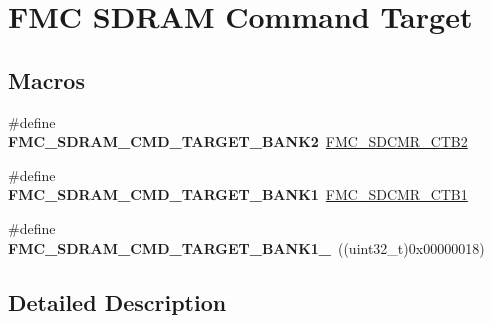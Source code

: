 \hypertarget{group___f_m_c___s_d_r_a_m___command___target}{}\section{F\+MC S\+D\+R\+AM Command Target}
\label{group___f_m_c___s_d_r_a_m___command___target}
\subsection*{Macros}
\begin{DoxyCompactItemize}
\item 
\#define {\bfseries F\+M\+C\+\_\+\+S\+D\+R\+A\+M\+\_\+\+C\+M\+D\+\_\+\+T\+A\+R\+G\+E\+T\+\_\+\+B\+A\+N\+K2}~\hyperlink{group___peripheral___registers___bits___definition_ga87be0a3520cec2885d2fc16589b97ba0}{F\+M\+C\+\_\+\+S\+D\+C\+M\+R\+\_\+\+C\+T\+B2}\hypertarget{group___f_m_c___s_d_r_a_m___command___target_gae0394622e1c2e7abb15825a4c1941f59}{}\label{group___f_m_c___s_d_r_a_m___command___target_gae0394622e1c2e7abb15825a4c1941f59}

\item 
\#define {\bfseries F\+M\+C\+\_\+\+S\+D\+R\+A\+M\+\_\+\+C\+M\+D\+\_\+\+T\+A\+R\+G\+E\+T\+\_\+\+B\+A\+N\+K1}~\hyperlink{group___peripheral___registers___bits___definition_ga4e5ca0bd4982c8354c021b53ef8e65e9}{F\+M\+C\+\_\+\+S\+D\+C\+M\+R\+\_\+\+C\+T\+B1}\hypertarget{group___f_m_c___s_d_r_a_m___command___target_ga6b78f8593d1fd620f659406d5fc72a4c}{}\label{group___f_m_c___s_d_r_a_m___command___target_ga6b78f8593d1fd620f659406d5fc72a4c}

\item 
\#define {\bfseries F\+M\+C\+\_\+\+S\+D\+R\+A\+M\+\_\+\+C\+M\+D\+\_\+\+T\+A\+R\+G\+E\+T\+\_\+\+B\+A\+N\+K1\+\_}~((uint32\+\_\+t)0x00000018)\hypertarget{group___f_m_c___s_d_r_a_m___command___target_gac837eb624920f03c2849021b387306c3}{}\label{group___f_m_c___s_d_r_a_m___command___target_gac837eb624920f03c2849021b387306c3}

\end{DoxyCompactItemize}


\subsection{Detailed Description}

